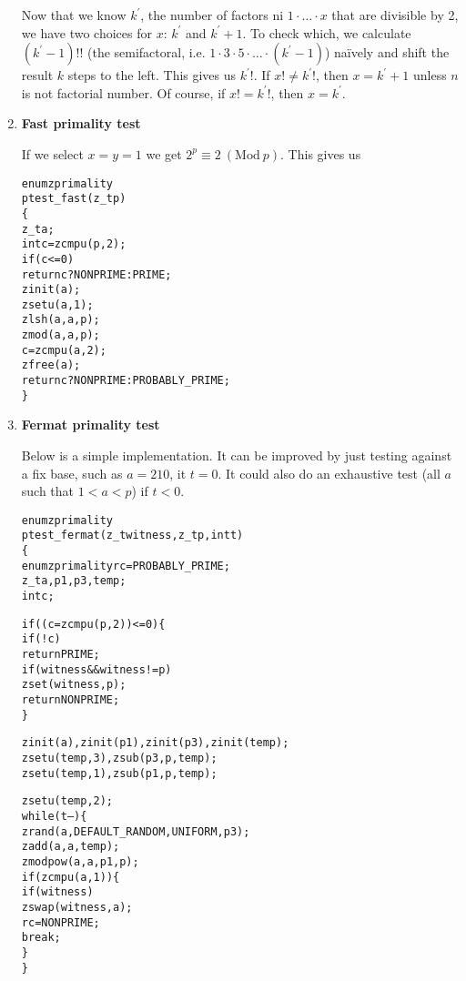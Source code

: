 \begin{enumerate}[label=\textbf{\arabic*}.]
Now that we know $k^\prime$, the number of
factors ni $1 \cdot \ldots \cdot x$ that are
divisible by 2, we have two choices for $x$:
$k^\prime$ and $k^\prime + 1$. To check which, we
calculate $(k^\prime - 1)!!$ (the semifactoral, i.e.
$1 \cdot 3 \cdot 5 \cdot \ldots \cdot (k^\prime - 1)$)
naïvely and shift the result $k$ steps to the left.
This gives us $k^\prime!$. If $x! \neq k^\prime!$, then
$x = k^\prime + 1$ unless $n$ is not factorial number.
Of course, if $x! = k^\prime!$, then $x = k^\prime$.



\item \textbf{Fast primality test}

If we select $x = y = 1$ we get
$2^p \equiv 2 ~(\text{Mod}~p)$. This gives us

\vspace{-1em}
\begin{alltt}
enum zprimality
ptest_fast(z_t p)
\{
    z_t a;
    int c = zcmpu(p, 2);
    if (c <= 0)
        return c ? NONPRIME : PRIME;
    zinit(a);
    zsetu(a, 1);
    zlsh(a, a, p);
    zmod(a, a, p);
    c = zcmpu(a, 2);
    zfree(a);
    return c ? NONPRIME : PROBABLY_PRIME;
\}
\end{alltt}
\vspace{-1em}



\item \textbf{Fermat primality test}

Below is a simple implementation. It can be improved by
just testing against a fix base, such as $a = 210$, it
$t = 0$. It could also do an exhaustive test (all $a$
such that $1 < a < p$) if $t < 0$.

\vspace{-1em}
\begin{alltt}
enum zprimality
ptest_fermat(z_t witness, z_t p, int t)
\{
    enum zprimality rc = PROBABLY_PRIME;
    z_t a, p1, p3, temp;
    int c;

    if ((c = zcmpu(p, 2)) <= 0) \{
        if (!c)
            return PRIME;
        if (witness && witness != p)
            zset(witness, p);
        return NONPRIME;
    \}

    zinit(a), zinit(p1), zinit(p3), zinit(temp);
    zsetu(temp, 3), zsub(p3, p, temp);
    zsetu(temp, 1), zsub(p1, p, temp);

    zsetu(temp, 2);
    while (t--) \{
        zrand(a, DEFAULT_RANDOM, UNIFORM, p3);
        zadd(a, a, temp);
        zmodpow(a, a, p1, p);
        if (zcmpu(a, 1)) \{
            if (witness)
                zswap(witness, a);
            rc = NONPRIME;
            break;
        \}
    \}


\end{alltt}
\end{enumerate}
